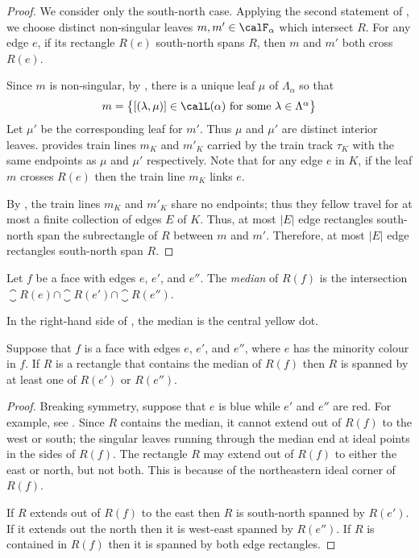 \documentclass[12pt]{amsart}
\begin{document}
\begin{proof}
We consider only the south-north case. Applying the second statement of , we choose distinct non-singular leaves $m, m' \in \calF_\alpha$ which intersect $R$.  
For any edge $e$, if its rectangle $R(e)$ south-north spans $R$, then $m$ and $m'$ both cross $R(e)$.

Since $m$ is non-singular, by , there is a unique leaf $\mu$ of $\Lambda_\alpha$ so that
\[
m = \big\{ [(\lambda, \mu)] \in \calL(\alpha) \mbox{ for some $\lambda \in \Lambda^\alpha$} \big\}
\]
Let $\mu'$ be the corresponding leaf for $m'$.  Thus $\mu$ and $\mu'$ are distinct interior leaves.   provides train lines $m_K$ and $m'_K$ carried by the train track $\tau_K$ with the same endpoints as $\mu$ and $\mu'$ respectively.  Note that for any edge $e$ in $K$, if the leaf $m$ crosses $R(e)$ then the train line $m_K$ links $e$.

By , the train lines $m_K$ and $m'_K$ share no endpoints; thus they fellow travel for at most a finite collection of edges $E$ of $K$.  Thus, at most $|E|$ edge rectangles south-north span the subrectangle of $R$ between $m$ and $m'$.  Therefore, at most $|E|$ edge rectangles south-north span $R$.
\end{proof}

\begin{definition}
\label{Def:FaceRectangleMedian}
Let $f$ be a face with edges $e$, $e'$, and $e''$. The \emph{median} of $R(f)$ is the intersection $\closure{R}(e) \cap \closure{R}(e') \cap \closure{R}(e'')$.
\end{definition}

In the right-hand side of , the median is the central yellow dot. 

\begin{lemma}
\label{Lem:MedianSpan}
Suppose that $f$ is a face with edges $e$, $e'$, and $e''$, where $e$ has the minority colour in $f$.  If $R$ is a rectangle that contains the median of $R(f)$ then $R$ is spanned by at least one of $R(e')$ or $R(e'')$.
\end{lemma}

\begin{proof}
Breaking symmetry, suppose that $e$ is blue while $e'$ and $e''$ are red.  For example, see .  Since $R$ contains the median, it cannot extend out of $R(f)$ to the west or south; the singular leaves running through the median end at ideal points in the sides of $R(f)$.  The rectangle $R$ may extend out of $R(f)$ to either the east or north, but not both.  This is because of the northeastern ideal corner of $R(f)$. 

If $R$ extends out of $R(f)$ to the east then $R$ is south-north spanned by $R(e')$.  If it extends out the north then it is west-east spanned by $R(e'')$.  If $R$ is contained in $R(f)$ then it is spanned by both edge rectangles.
\end{proof}
\end{document}
